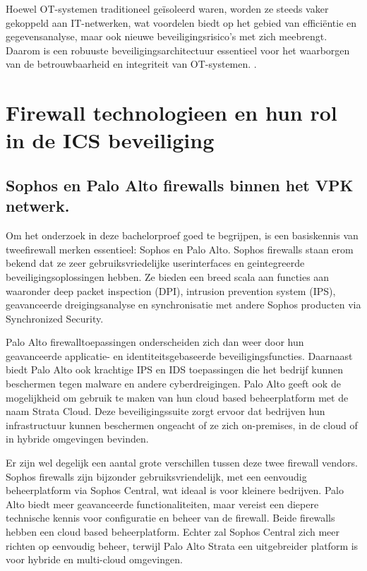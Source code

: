 Hoewel OT-systemen traditioneel geïsoleerd waren, worden ze steeds vaker gekoppeld aan IT-netwerken, wat voordelen biedt op het gebied van efficiëntie en gegevensanalyse, maar ook nieuwe beveiligingsrisico’s met zich meebrengt. Daarom is een robuuste beveiligingsarchitectuur essentieel voor het waarborgen van de betrouwbaarheid en integriteit van OT-systemen. \autocite{Stouffer2023}.

\section{Firewall technologieen en hun rol in de ICS beveiliging}

\subsection{Sophos en Palo Alto firewalls binnen het VPK netwerk.}
Om het onderzoek in deze bachelorproef goed te begrijpen, is een basiskennis van tweefirewall merken essentieel: Sophos en Palo Alto. Sophos firewalls staan erom bekend dat ze zeer gebruiksvriedelijke userinterfaces en geintegreerde beveiligingsoplossingen hebben. Ze bieden een breed scala aan functies aan waaronder deep packet inspection (DPI), intrusion prevention system (IPS), geavanceerde dreigingsanalyse en synchronisatie met andere Sophos producten via Synchronized Security. \autocite{Phipps2024}

Palo Alto firewalltoepassingen onderscheiden zich dan weer door hun geavanceerde applicatie- en identiteitsgebaseerde beveiligingsfuncties. Daarnaast biedt Palo Alto ook krachtige IPS en IDS toepassingen die het bedrijf kunnen beschermen tegen malware en andere cyberdreigingen. Palo Alto geeft ook de mogelijkheid om gebruik te maken van hun cloud based beheerplatform met de naam Strata Cloud. Deze beveiligingssuite zorgt ervoor dat bedrijven hun infrastructuur kunnen beschermen ongeacht of ze zich on-premises, in de cloud of in hybride omgevingen bevinden. \autocite{shread2023}

Er zijn wel degelijk een aantal grote verschillen tussen deze twee firewall vendors. Sophos firewalls zijn bijzonder gebruiksvriendelijk, met een eenvoudig beheerplatform via Sophos Central, wat ideaal is voor kleinere bedrijven. Palo Alto biedt meer geavanceerde functionaliteiten, maar vereist een diepere technische kennis voor configuratie en beheer van de firewall. Beide firewalls hebben een cloud based beheerplatform. Echter zal Sophos Central zich meer richten op eenvoudig beheer, terwijl Palo Alto Strata een uitgebreider platform is voor hybride en multi-cloud omgevingen. \autocite{paloGuard2025} 

